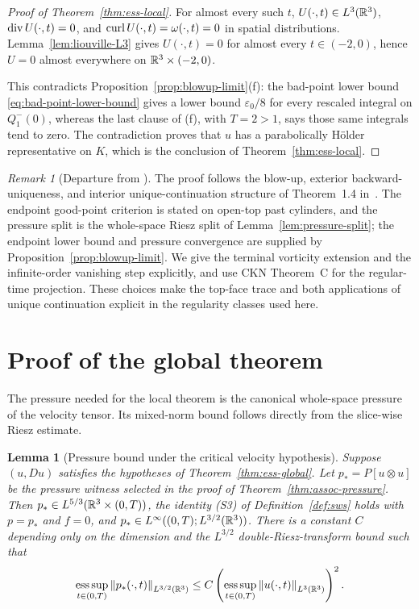\documentclass[11pt,letterpaper]{article}
\numberwithin{equation}{section}
\theoremstyle{plain}
\newtheorem{lemma}[theorem]{Lemma}
\theoremstyle{definition}
\theoremstyle{remark}
\newtheorem{remark}[theorem]{Remark}
\begin{document}
\begin{proof}[Proof of Theorem~\ref{thm:ess-local}]
For almost every such $t$, $U(\cdot,t)\in L^3(\mathbb{R}^3)$,
$\operatorname{div} U(\cdot,t)=0$, and $\operatorname{curl} U(\cdot,t)=\omega(\cdot,t)=0$ in spatial
distributions. Lemma~\ref{lem:liouville-L3} gives
$U(\cdot,t)=0$ for almost every $t\in(-2,0)$, hence
$U=0$ almost everywhere on $\mathbb{R}^3\times(-2,0)$.

This contradicts Proposition~\ref{prop:blowup-limit}(f): the bad-point
lower bound \eqref{eq:bad-point-lower-bound} gives a lower bound
$\varepsilon_0/8$ for every rescaled integral on $Q_1^-(0)$, whereas the
last clause of (f), with $T=2>1$, says those same integrals tend to zero.
The contradiction proves that $u$ has a parabolically H\"older
representative on $K$, which is the conclusion of
Theorem~\ref{thm:ess-local}.
\end{proof}

\begin{remark}[Departure from \cite{ESS2003}]\label{rem:thm-local-departure}
The proof follows the blow-up, exterior backward-uniqueness, and interior
unique-continuation structure of Theorem~1.4 in~\cite[pp.~222--229]{ESS2003}. The endpoint good-point criterion is stated on open-top
past cylinders, and the pressure split is the whole-space Riesz split of
Lemma~\ref{lem:pressure-split}; the endpoint lower bound and pressure
convergence are supplied by Proposition~\ref{prop:blowup-limit}. We give
the terminal vorticity extension and the infinite-order vanishing step
explicitly, and use CKN Theorem~C for the regular-time projection. These
choices make the top-face trace and both applications of unique continuation
explicit in the regularity classes used here.
\end{remark}

\section{Proof of the global theorem}\label{sec:thm-global}

The pressure needed for the local theorem is the canonical whole-space pressure
of the velocity tensor. Its mixed-norm bound follows directly from the
slice-wise Riesz estimate.

\begin{lemma}[Pressure bound under the critical velocity hypothesis]
\label{lem:assoc-pressure-L3}
Suppose $(u,Du)$ satisfies the hypotheses of
Theorem~\ref{thm:ess-global}. Let $p_*=P[u\otimes u]$ be the pressure witness
selected in the proof of Theorem~\ref{thm:assoc-pressure}. Then
$p_*\in L^{5/3}(\mathbb{R}^3\times(0,T))$, the identity (S3) of
Definition~\ref{def:sws} holds with $p=p_*$ and $f=0$, and
$p_*\in L^\infty((0,T);L^{3/2}(\mathbb{R}^3))$. There is a constant $C$ depending
only on the dimension and the $L^{3/2}$ double-Riesz-transform bound such that
\[
 \operatorname*{ess\,sup}_{t\in(0,T)}\left\lVert p_*(\cdot,t)\right\rVert_{L^{3/2}(\mathbb{R}^3)}
 \le C\left(\operatorname*{ess\,sup}_{t\in(0,T)}
                 \left\lVert u(\cdot,t)\right\rVert_{L^3(\mathbb{R}^3)}\right)^2.
\]
\end{lemma}
\end{document}
